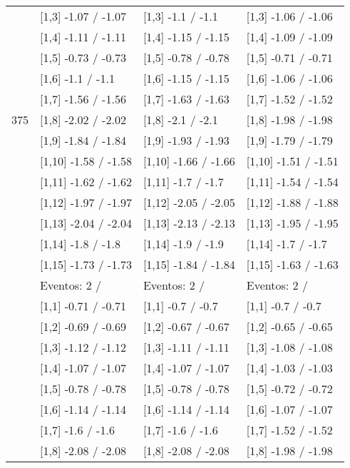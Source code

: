 \begin{table}
\begin{tabular}[t]{llll}
 & {}[1,3] -1.07  / -1.07 & {}[1,3] -1.1  / -1.1 & {}[1,3] -1.06  / -1.06\\
\addlinespace
 & {}[1,4] -1.11  / -1.11 & {}[1,4] -1.15  / -1.15 & {}[1,4] -1.09  / -1.09\\
 & {}[1,5] -0.73  / -0.73 & {}[1,5] -0.78  / -0.78 & {}[1,5] -0.71  / -0.71\\
 & {}[1,6] -1.1  / -1.1 & {}[1,6] -1.15  / -1.15 & {}[1,6] -1.06  / -1.06\\
 & {}[1,7] -1.56  / -1.56 & {}[1,7] -1.63  / -1.63 & {}[1,7] -1.52  / -1.52\\
375 & {}[1,8] -2.02  / -2.02 & {}[1,8] -2.1  / -2.1 & {}[1,8] -1.98  / -1.98\\
\addlinespace
 & {}[1,9] -1.84  / -1.84 & {}[1,9] -1.93  / -1.93 & {}[1,9] -1.79  / -1.79\\
 & {}[1,10] -1.58  / -1.58 & {}[1,10] -1.66  / -1.66 & {}[1,10] -1.51  / -1.51\\
 & {}[1,11] -1.62  / -1.62 & {}[1,11] -1.7  / -1.7 & {}[1,11] -1.54  / -1.54\\
 & {}[1,12] -1.97  / -1.97 & {}[1,12] -2.05  / -2.05 & {}[1,12] -1.88  / -1.88\\
 & {}[1,13] -2.04  / -2.04 & {}[1,13] -2.13  / -2.13 & {}[1,13] -1.95  / -1.95\\
\addlinespace
 & {}[1,14] -1.8  / -1.8 & {}[1,14] -1.9  / -1.9 & {}[1,14] -1.7  / -1.7\\
 & {}[1,15] -1.73  / -1.73 & {}[1,15] -1.84  / -1.84 & {}[1,15] -1.63  / -1.63\\
 & Eventos:  2 / & Eventos:  2 / & Eventos:  2 /\\
 & {}[1,1] -0.71  / -0.71 & {}[1,1] -0.7  / -0.7 & {}[1,1] -0.7  / -0.7\\
 & {}[1,2] -0.69  / -0.69 & {}[1,2] -0.67  / -0.67 & {}[1,2] -0.65  / -0.65\\
\addlinespace
 & {}[1,3] -1.12  / -1.12 & {}[1,3] -1.11  / -1.11 & {}[1,3] -1.08  / -1.08\\
 & {}[1,4] -1.07  / -1.07 & {}[1,4] -1.07  / -1.07 & {}[1,4] -1.03  / -1.03\\
 & {}[1,5] -0.78  / -0.78 & {}[1,5] -0.78  / -0.78 & {}[1,5] -0.72  / -0.72\\
 & {}[1,6] -1.14  / -1.14 & {}[1,6] -1.14  / -1.14 & {}[1,6] -1.07  / -1.07\\
 & {}[1,7] -1.6  / -1.6 & {}[1,7] -1.6  / -1.6 & {}[1,7] -1.52  / -1.52\\
\addlinespace
500 & {}[1,8] -2.08  / -2.08 & {}[1,8] -2.08  / -2.08 & {}[1,8] -1.98  / -1.98\\

\end{tabular}
\end{table}
